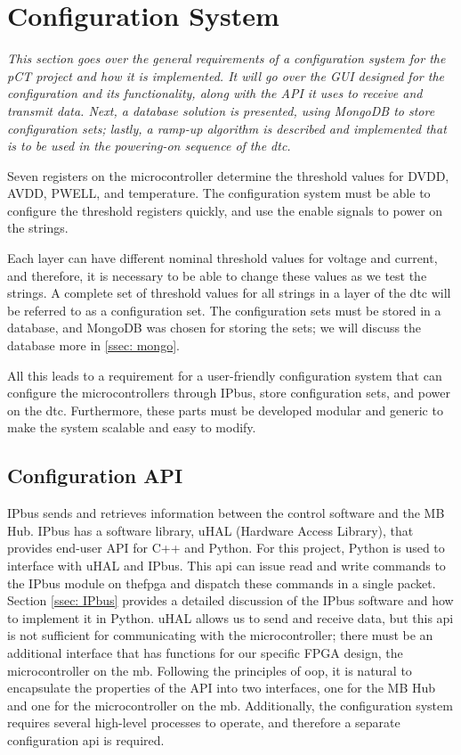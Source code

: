 \documentclass[main.tex]{subfiles}
\begin{document}
\section{Configuration System}
\label{section: configuration}
\textit{This section goes over the general requirements of a configuration system for the pCT project and how it is implemented. It will go over the GUI designed for the configuration and its functionality, along with the API it uses to receive and transmit data. Next, a database solution is presented, using MongoDB to store configuration sets; lastly, a ramp-up algorithm is described and implemented that is to be used in the powering-on sequence of the \gls{dtc}.}


 Seven registers on the microcontroller determine the threshold values for DVDD, AVDD, PWELL, and temperature. The configuration system must be able to configure the threshold registers quickly, and use the enable signals to power on the strings.

Each layer can have different nominal threshold values for voltage and current, and therefore, it is necessary to be able to change these values as we test the strings. A complete set of threshold values for all strings in a layer of the \gls{dtc} will be referred to as a configuration set. The configuration sets must be stored in a database, and MongoDB was chosen for storing the sets; we will discuss the database more in \autoref{ssec: mongo}.

All this leads to a requirement for a user-friendly configuration system that can configure the microcontrollers through IPbus, store configuration sets, and power on the \gls{dtc}. Furthermore, these parts must be developed modular and generic to make the system scalable and easy to modify.

\subsection{Configuration API}
\label{ssec: mcu_api}
IPbus sends and retrieves information between the control software and the MB Hub. IPbus has a software library, uHAL (Hardware Access Library), that provides end-user API for C++ and Python. For this project,  Python is used to interface with uHAL and IPbus. This \gls{api} can issue read and write commands to the IPbus module on the\gls{fpga} and dispatch these commands in a single packet. Section \ref{ssec: IPbus} provides a detailed discussion of the IPbus software and how to implement it in Python. uHAL allows us to send and receive data, but this \gls{api} is not sufficient for communicating with the microcontroller; there must be an additional interface that has functions for our specific FPGA design, the microcontroller on the \gls{mb}. Following the principles of \gls{oop}, it is natural to encapsulate the properties of the API into two interfaces, one for the MB Hub and one for the microcontroller on the \gls{mb}. Additionally, the configuration system requires several high-level processes to operate, and therefore a separate configuration \gls{api} is required.
\end{document}
